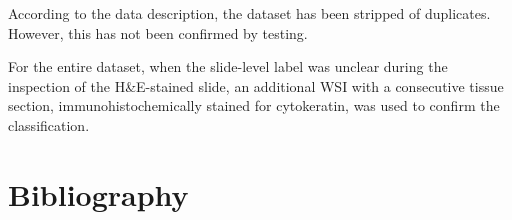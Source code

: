 \documentclass[19pt]{article}
\begin{document}
According to the data description, the dataset has been stripped of duplicates. However, this has not been confirmed by testing.

    For the entire dataset, when the slide-level label was unclear during the inspection of the H\&E-stained slide, an additional WSI with a consecutive tissue section, immunohistochemically stained for cytokeratin, was used to confirm the classification.


\newpage
\section{Bibliography}
  
  


\end{document}
